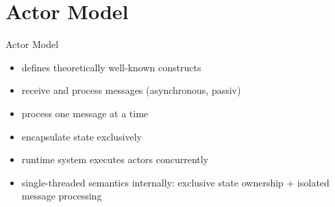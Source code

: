 \documentclass{beamer}
\begin{document}

\section{Actor Model}






\begin{frame}{Actor Model}


\begin{itemize}
  \item defines theoretically well-known constructs
  \item receive and process messages (asynchronous, passiv)
  \item process one message at a time
  \item encapsulate state exclusively
  \item runtime system executes actors concurrently
  \item single-threaded semantics internally: exclusive state ownership $+$ isolated message processing
\end{itemize}

\end{frame}
\end{document}
